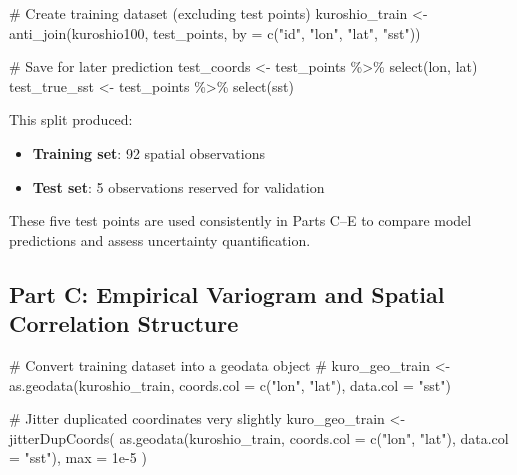 \documentclass[
  11pt,
]{article}
\newenvironment{Shaded}{\begin{snugshade}}{\end{snugshade}}
\newcommand{\AttributeTok}[1]{\textcolor[rgb]{0.40,0.45,0.13}{#1}}
\newcommand{\CommentTok}[1]{\textcolor[rgb]{0.37,0.37,0.37}{#1}}
\newcommand{\FloatTok}[1]{\textcolor[rgb]{0.68,0.00,0.00}{#1}}
\newcommand{\FunctionTok}[1]{\textcolor[rgb]{0.28,0.35,0.67}{#1}}
\newcommand{\NormalTok}[1]{\textcolor[rgb]{0.00,0.23,0.31}{#1}}
\newcommand{\OtherTok}[1]{\textcolor[rgb]{0.00,0.23,0.31}{#1}}
\newcommand{\SpecialCharTok}[1]{\textcolor[rgb]{0.37,0.37,0.37}{#1}}
\newcommand{\StringTok}[1]{\textcolor[rgb]{0.13,0.47,0.30}{#1}}
\begin{document}
\begin{Shaded}
\begin{Highlighting}[]
\CommentTok{\# Create training dataset (excluding test points)}
\NormalTok{kuroshio\_train }\OtherTok{\textless{}{-}} \FunctionTok{anti\_join}\NormalTok{(kuroshio100, test\_points, }\AttributeTok{by =} \FunctionTok{c}\NormalTok{(}\StringTok{"id"}\NormalTok{, }\StringTok{"lon"}\NormalTok{, }\StringTok{"lat"}\NormalTok{, }\StringTok{"sst"}\NormalTok{))}

\CommentTok{\# Save for later prediction}
\NormalTok{test\_coords }\OtherTok{\textless{}{-}}\NormalTok{ test\_points }\SpecialCharTok{\%\textgreater{}\%} \FunctionTok{select}\NormalTok{(lon, lat)}
\NormalTok{test\_true\_sst }\OtherTok{\textless{}{-}}\NormalTok{ test\_points }\SpecialCharTok{\%\textgreater{}\%} \FunctionTok{select}\NormalTok{(sst)}
\end{Highlighting}
\end{Shaded}

This split produced:

\begin{itemize}
\item
  \textbf{Training set}: 92 spatial observations
\item
  \textbf{Test set}: 5 observations reserved for validation
\end{itemize}

These five test points are used consistently in Parts C--E to compare
model predictions and assess uncertainty quantification.

\subsection{Part C: Empirical Variogram and Spatial Correlation
Structure}\label{part-c-empirical-variogram-and-spatial-correlation-structure}

\begin{Shaded}
\begin{Highlighting}[]
\CommentTok{\# Convert training dataset into a geodata object}
\CommentTok{\# kuro\_geo\_train \textless{}{-} as.geodata(kuroshio\_train, coords.col = c("lon", "lat"), data.col = "sst")}

\CommentTok{\# Jitter duplicated coordinates very slightly}
\NormalTok{kuro\_geo\_train }\OtherTok{\textless{}{-}} \FunctionTok{jitterDupCoords}\NormalTok{(}
  \FunctionTok{as.geodata}\NormalTok{(kuroshio\_train, }\AttributeTok{coords.col =} \FunctionTok{c}\NormalTok{(}\StringTok{"lon"}\NormalTok{, }\StringTok{"lat"}\NormalTok{), }\AttributeTok{data.col =} \StringTok{"sst"}\NormalTok{),}
  \AttributeTok{max =} \FloatTok{1e{-}5}
\NormalTok{)}
\end{Highlighting}
\end{Shaded}
\end{document}
